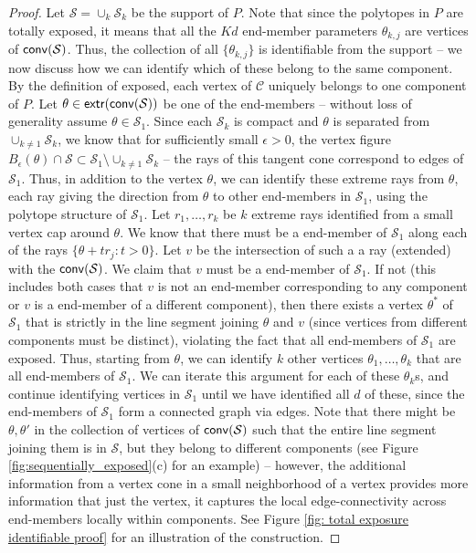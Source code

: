 \documentclass[bj,authoryear]{imsart}
\theoremstyle{plain}
\theoremstyle{remark}
\def\cC{\mathcal{C}}
\def\cS{\mathcal{S}}
\def\conv{{\sf conv}}
\def\extr{{\sf extr }}
\begin{document}
\begin{appendix}
\begin{proof}
Let $\cS=\cup_k \cS_k$ be the support of $P$. Note that since the polytopes in $P$ are totally exposed, it means that all the $Kd$ end-member parameters $\theta_{k,j}$ are vertices of $\conv(\cS)$. Thus, the collection of all $\{\theta_{k,j}\}$ is identifiable from the support -- we now discuss how we can identify which of these belong to the same component. By the definition of exposed, each vertex of $\cC$ uniquely belongs to one component of $P$. Let $\theta\in \extr(\conv(\cS))$ be one of the end-members -- without loss of generality assume $\theta\in \cS_1$. Since each $\cS_k$ is compact and $\theta$ is separated from $\cup_{k\neq 1} \cS_k$, we know that for sufficiently small $\epsilon>0$, the vertex figure $B_{\epsilon}(\theta) \cap \cS \subset \cS_1\setminus\cup_{k\neq 1} \cS_k$ -- the rays of this tangent cone correspond to edges of $\cS_1$. Thus, in addition to the vertex $\theta$, we can identify these extreme rays from $\theta$, each ray giving the direction from $\theta$ to other end-members in $\cS_1$, using the polytope structure of $\cS_1$. Let $r_1,\dots,r_k$ be $k$ extreme rays identified from a small vertex cap around $\theta$. We know that there must be a end-member of $\cS_1$ along each of the rays $\{\theta + tr_j:t>0\}$. Let $v$ be the intersection of such a a ray (extended) with the $\conv(\cS)$. We claim that $v$ must be a end-member of $\cS_1$. If not (this includes both cases that $v$ is not an end-member corresponding to any component or $v$ is a end-member of a different component), then there exists a vertex $\theta^*$ of $\cS_1$ that is strictly in the line segment joining $\theta$ and $v$ (since vertices from different components must be distinct), violating the fact that all end-members of $\cS_1$ are exposed. Thus, starting from $\theta$, we can identify $k$ other vertices $\theta_1,\dots,\theta_k$ that are all end-members of $\cS_1$. We can iterate this argument for each of these $\theta_k$s, and continue identifying vertices in $\cS_1$ until we have identified all $d$ of these, since the end-members of $\cS_1$ form a connected graph via edges. Note that there might be $\theta,\theta'$ in the collection of vertices of $\conv(\cS)$ such that the entire line segment joining them is in $\cS$, but they belong to different components (see Figure \ref{fig:sequentially_exposed}(c) for an example) -- however, the additional information from a vertex cone in a small neighborhood of a vertex provides more information that just the vertex, it captures the local edge-connectivity across end-members locally within components. See Figure \ref{fig: total exposure identifiable proof} for an illustration of the construction.


\end{proof}
\end{appendix}
\end{document}
